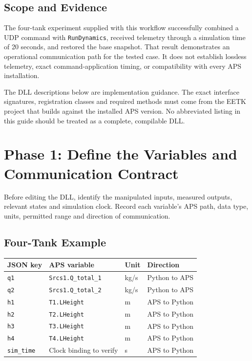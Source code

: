 \documentclass[11pt, letterpaper]{article}
\begin{document}
\subsection{Scope and Evidence}
The four-tank experiment supplied with this workflow successfully combined a UDP command with \texttt{RunDynamics}, received telemetry through a simulation time of 20 seconds, and restored the base snapshot. That result demonstrates an operational communication path for the tested case. It does not establish lossless telemetry, exact command-application timing, or compatibility with every APS installation.

The DLL descriptions below are implementation guidance. The exact interface signatures, registration classes and required methods must come from the EETK project that builds against the installed APS version. No abbreviated listing in this guide should be treated as a complete, compilable DLL.

\section{Phase 1: Define the Variables and Communication Contract}
Before editing the DLL, identify the manipulated inputs, measured outputs, relevant states and simulation clock. Record each variable's APS path, data type, units, permitted range and direction of communication.

\subsection{Four-Tank Example}
\begin{tabularx}{\textwidth}{l l l X}
\toprule
\textbf{JSON key} & \textbf{APS variable} & \textbf{Unit} & \textbf{Direction} \\
\midrule
\texttt{q1} & \texttt{Srcs1.Q\_total\_1} & kg/s & Python to APS \\
\texttt{q2} & \texttt{Srcs1.Q\_total\_2} & kg/s & Python to APS \\
\texttt{h1} & \texttt{T1.LHeight} & m & APS to Python \\
\texttt{h2} & \texttt{T2.LHeight} & m & APS to Python \\
\texttt{h3} & \texttt{T3.LHeight} & m & APS to Python \\
\texttt{h4} & \texttt{T4.LHeight} & m & APS to Python \\
\texttt{sim\_time} & Clock binding to verify & s & APS to Python \\
\bottomrule
\end{tabularx}
\end{document}
